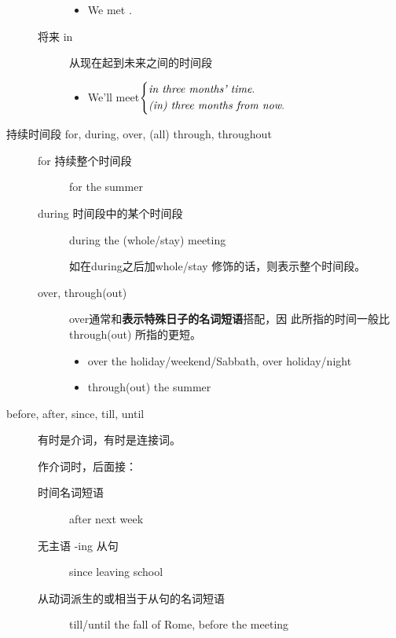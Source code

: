 \begin{description}
\begin{description}
    \begin{itemize}
    \item We met .
    \end{itemize}

  \item[将来 in] 从现在起到未来之间的时间段
    \begin{itemize}
    \item We'll meet$ \left\{
        \begin{aligned}
          &\text{\emph{in three months' time}.} \\
          &\text{\emph{(in) three months from now}.} \\
        \end{aligned}
      \right. $
    \end{itemize}
  \end{description}

\item[持续时间段 for, during, over, (all) through, throughout]
  \begin{description}
  \item [for 持续整个时间段] for the summer

  \item[during 时间段中的某个时间段] during the (whole/stay) meeting

    如在during之后加whole/stay 修饰的话，则表示整个时间段。

  \item[over, through(out)] over通常和\textbf{表示特殊日子的名词短语}搭配，因
    此所指的时间一般比 through(out) 所指的更短。
    \begin{itemize}

    \item over the holiday/weekend/Sabbath, over holiday/night

    \item through(out) the summer
    \end{itemize}

  \end{description}
\item[before, after, since, till, until] 有时是介词，有时是连接词。

  作介词时，后面接：
  \begin{description}
  \item[时间名词短语] after next week
  \item[无主语 -ing 从句] since leaving school
  \item[从动词派生的或相当于从句的名词短语] till/until the fall of Rome,
    before the meeting
  \end{description}


\end{description}
